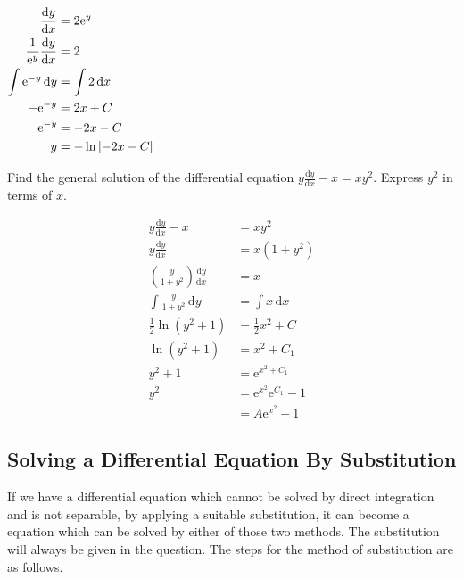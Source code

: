 \documentclass[11pt,a4paper]{book}
\begin{document}
\begin{example}
\begin{tasks}[label=(\alph*),label-width=3.5ex]
\task
$
\begin{aligned}[t]
\frac{{\rm d}y}{{\rm d}x} & =2{\rm e}^{y}\\
\frac{1}{{\rm e}^{y}}\frac{{\rm d}y}{{\rm d}x} & =2\\
\int{\rm e}^{-y}\,{\rm d}y & =\int2\,{\rm d}x\\
-{\rm e}^{-y} & =2x+C\\
{\rm e}^{-y} & =-2x-C\\
y & =-\ln\left|-2x-C\right|
\end{aligned}
$

\end{tasks}

\end{example}

\begin{example}

Find the general solution of the differential equation ${\displaystyle y\frac{\mathrm{d}y}{\mathrm{d}x}-x=xy^{2}}$.
Express $y^{2}$ in terms of $x$.

\Solution

\begin{align*}
{\displaystyle y\frac{\mathrm{d}y}{\mathrm{d}x}-x} & =xy^{2}\\
y\frac{\mathrm{d}y}{\mathrm{d}x} & =x\left(1+y^{2}\right)\\
\left(\frac{y}{1+y^{2}}\right)\frac{\mathrm{d}y}{\mathrm{d}x} & =x\\
\int\frac{y}{1+y^{2}}\,\mathrm{d}y & =\int x\, \mathrm{d}x\\
\frac{1}{2}\ln\left(y^{2}+1\right) & =\frac{1}{2}x^{2}+C\\
\ln\left(y^{2}+1\right) & =x^{2}+C_{1}\\
y^{2}+1 & =\mathrm{e}^{x^{2}+C_{1}}\\
y^{2} & =\mathrm{e}^{x^{2}}\mathrm{e}^{C_{1}}-1\\
 & =A\mathrm{e}^{x^{2}}-1
\end{align*}

\end{example}

\subsection{Solving a Differential Equation By Substitution}

If we have a differential equation which cannot be solved by direct
integration and is not separable, by applying a suitable substitution,
it can become a equation which can be solved by either of those two
methods. The substitution will always be given in the question. The
steps for the method of substitution are as follows.
\end{document}
